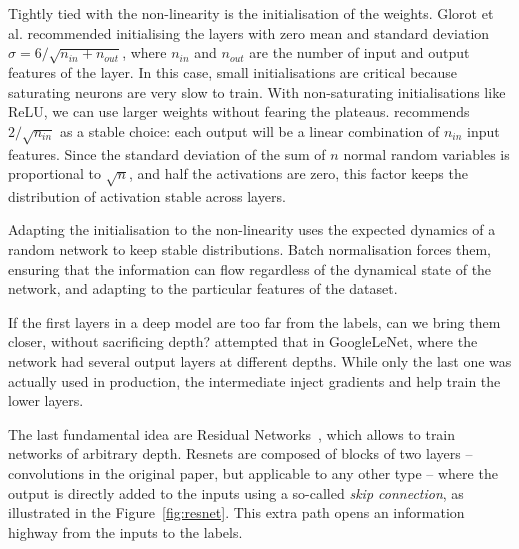 Tightly tied  with the non-linearity is the initialisation of the weights.
Glorot et al. recommended initialising the layers with zero mean and standard deviation $\sigma=6/\sqrt{n_{in}+ n_{out}}$, where $n_{in}$ and $n_{out}$ are the number of input and output features of the layer.
In this case, small initialisations are critical because saturating neurons are very slow to train.
With non-saturating initialisations like ReLU, we can use larger weights without fearing the plateaus.
\citet{he} recommends $2/\sqrt{n_{in}}$ as a stable choice: each output will be a linear combination of $n_{in}$ input features.
Since the standard deviation of the sum of $n$ normal random variables is proportional to $\sqrt{n}$, and half the activations are zero, this factor keeps the distribution of activation stable across layers.

Adapting the initialisation  to the non-linearity uses the expected dynamics of a random network to keep stable distributions.
Batch normalisation forces them, ensuring that the information can flow regardless of the dynamical state of the network, and adapting to the particular features of the dataset.

If the first layers  in a deep model are
too far from the labels, can we bring them closer, without sacrificing depth?
\citet{googlenet} attempted that in GoogleLeNet, where the network had several output layers at different depths.
While only the last one was actually used in production, the intermediate inject gradients and help train the lower layers.

The last fundamental idea  are Residual Networks~\citep{resnet}, which allows to train networks of arbitrary depth.
Resnets are composed of blocks of two layers  -- convolutions in the original paper, but applicable to any other type -- where the output is directly added to the inputs using a so-called \emph{skip connection}, as illustrated in the Figure~\ref{fig:resnet}.
This extra path opens an information highway from the inputs to the labels.

